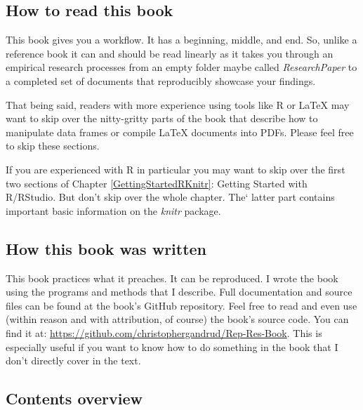 \subsection{How to read this book}

This book gives you a workflow. It has a beginning, middle, and end. So, unlike a reference book it can and should be read linearly as it takes you through an empirical research processes from an empty folder maybe called {\emph{ResearchPaper}} to a completed set of documents that reproducibly showcase your findings.

That being said, readers with more experience using tools like R or LaTeX may want to skip over the nitty-gritty parts of the book that describe how to manipulate data frames or compile LaTeX documents into PDFs. Please feel free to skip these sections.

If you are experienced with R in particular you may want to skip over the first two sections of Chapter \ref{GettingStartedRKnitr}: Getting Started with R/RStudio. But don't skip over the whole chapter. The` latter part contains important basic information on the {\emph{knitr}} package. 

\subsection{How this book was written}

This book practices what it preaches. It can be reproduced. I wrote the book using the programs and methods that I describe. Full documentation and source files can be found at the book's GitHub repository. Feel free to read and even use (within reason and with attribution, of course) the book's source code. You can find it at: \url{https://github.com/christophergandrud/Rep-Res-Book}.  This is especially useful if you want to know how to do something in the book that I don't directly cover in the text.

\subsection{Contents overview}

